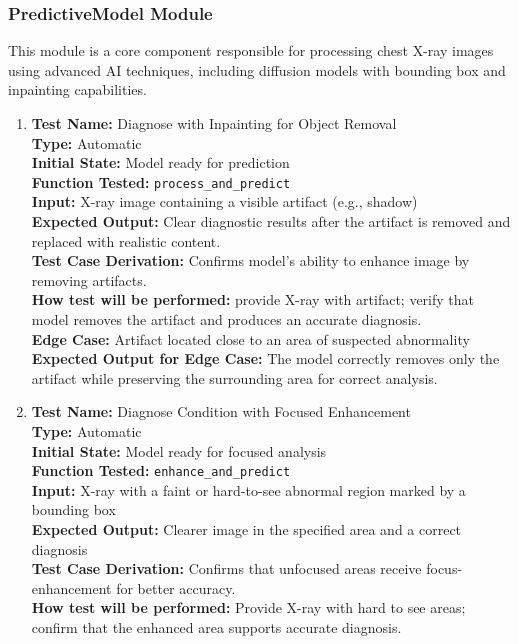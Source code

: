 \documentclass[12pt, titlepage]{article}
\begin{document}
\subsubsection{PredictiveModel Module}
This module is a core component responsible for processing chest X-ray images using advanced AI techniques, including diffusion models with bounding box and inpainting capabilities.
\begin{enumerate}
  \item \textbf{Test Name:}  Diagnose with Inpainting for Object Removal\\
    \textbf{Type:}  Automatic\\
    \textbf{Initial State:}  Model ready for prediction\\
    \textbf{Function Tested:}  \verb|process_and_predict|\\
    \textbf{Input:}  X-ray image containing a visible artifact (e.g., shadow)\\
    \textbf{Expected Output:}  Clear diagnostic results after the artifact is removed and replaced with realistic content.\\
    \textbf{Test Case Derivation:}  Confirms model's ability to enhance image by removing artifacts.\\
    \textbf{How test will be performed:}  provide X-ray with artifact; verify that model removes the artifact and produces an accurate diagnosis.\\
    \textbf{Edge Case:}  Artifact located close to an area of suspected abnormality\\
    \textbf{Expected Output for Edge Case:}  The model correctly removes only the artifact while preserving the surrounding area for correct analysis.\\

  \item \textbf{Test Name:}  Diagnose Condition with Focused Enhancement\\
    \textbf{Type:}  Automatic\\
    \textbf{Initial State:}  Model ready for focused analysis\\
    \textbf{Function Tested:}  \verb|enhance_and_predict|\\
    \textbf{Input:}  X-ray with a faint or hard-to-see abnormal region marked by a bounding box\\
    \textbf{Expected Output:}  Clearer image in the specified area and a correct diagnosis\\
    \textbf{Test Case Derivation:}  Confirms that unfocused areas receive focus- enhancement for better accuracy.\\
    \textbf{How test will be performed:}  Provide X-ray with hard to see areas; confirm that the enhanced area supports accurate diagnosis.\\


\end{enumerate}
\end{document}
